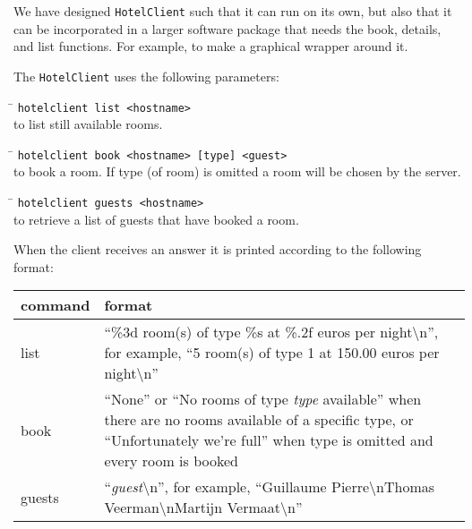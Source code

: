 \documentclass[a4paper,10pt]{article}
\begin{document}
We have designed \texttt{HotelClient} such that it can run on its own, but also
that it can be incorporated in a larger software package that needs
the book, details, and list functions. For example, to make a
graphical wrapper around it.

The \texttt{HotelClient} uses the following parameters:

\begin{tabbing}
\hspace{20pt}\=\kill
 \> \texttt{hotelclient list <hostname>} \\
 \> to list still available rooms.
\end{tabbing}

\begin{tabbing}
\hspace{20pt}\=\kill
 \> \texttt{hotelclient book <hostname> [type] <guest>} \\
 \> to book a room. If type (of room) is omitted a room will be chosen by the server.
\end{tabbing}

\begin{tabbing}
\hspace{20pt}\=\kill
 \> \texttt{hotelclient guests <hostname>} \\
 \> to retrieve a list of guests that have booked a room.
\end{tabbing}

When the client receives an answer it is printed according to the following format:

\begin{center}
\begin{tabular}{ l | p{9.3cm} }
\textbf{command} & \textbf{format}\\ \hline
list & ``\%3d room(s) of type \%s at \%.2f euros per night\textbackslash n'', for example, ``5 room(s) of type 1 at 150.00 euros per night\textbackslash n''\\ \hline
book & ``None'' or ``No rooms of type \emph{type} available'' when
there are no rooms available of a specific type, or ``Unfortunately we're full'' when type is omitted and every room is booked \\ \hline
guests & ``\emph{guest}\textbackslash n'', for example, ``Guillaume Pierre\textbackslash nThomas Veerman\textbackslash nMartijn Vermaat\textbackslash n'' \\
\end{tabular}
\end{center}
\end{document}
